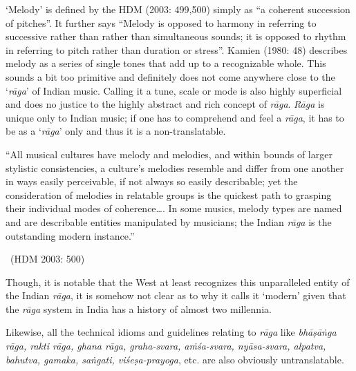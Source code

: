 ‘Melody’ is defined by the HDM (2003: 499,500) simply as “a coherent succession of pitches”. It further says “Melody is opposed to harmony in referring to successive rather than rather than simultaneous sounds; it is opposed to rhythm in referring to pitch rather than duration or stress”. Kamien (1980: 48) describes melody as a series of single tones that add up to a recognizable whole. This sounds a bit too primitive and definitely does not come anywhere close to the ‘\textit{rāga}’ of Indian music. Calling it a tune, scale or mode is also highly superficial and does no justice to the highly abstract and rich concept of \textit{rāga}. \textit{Rāga} is unique only to Indian music; if one has to comprehend and feel a \textit{rāga}, it has to be as a ‘\textit{rāga}’ only and thus it is a non-translatable.

\begin{myquote}
“All musical cultures have melody and melodies, and within bounds of larger stylistic consistencies, a culture’s melodies resemble and differ from one another in ways easily perceivable, if not always so easily describable; yet the consideration of melodies in relatable groups is the quickest path to grasping their individual modes of coherence…. In some musics, melody types are named and are describable entities manipulated by musicians; the Indian \textit{rāga} is the outstanding modern instance.” 

~\hfill (HDM 2003: 500)
\end{myquote}

Though, it is notable that the West at least recognizes this unparalleled entity of the Indian \textit{rāga}, it is somehow not clear as to why it calls it ‘modern’ given that the \textit{rāga} system in India has a history of almost two millennia.

Likewise, all the technical idioms and guidelines relating to \textit{rāga} like \textit{bhāṣāṅga rāga, rakti rāga, ghana rāga, graha-svara, aṁśa-svara, nyāsa-svara, alpatva, bahutva, gamaka, saṅgati, viśeṣa-prayoga}, etc. are also obviously untranslatable.


